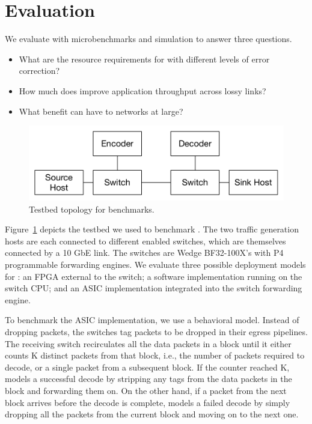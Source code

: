 \section{Evaluation}
\label{sec:evaluation}

We evaluate \OurSys with microbenchmarks and simulation to answer three questions.
\begin{itemize}

\item What are the resource requirements for \OurSys with different levels of 
error correction?

\item How much does \OurSys improve application throughput across lossy links?

\item What benefit can \OurSys have to networks at large?
\end{itemize}

\begin{figure}
  \centering
  \includegraphics[width=0.3\paperwidth]{exp_topo.pdf}
  \caption{\label{fig:exp_topo} Testbed topology for benchmarks.}
\end{figure}

Figure~\ref{fig:exp_topo} depicts the testbed we used to benchmark \OurSys.
The two traffic generation hosts are each connected to different \OurSys
enabled switches, which are themselves connected by a 10 GbE link. The
switches are Wedge BF32-100X's with P4 programmable forwarding engines. We
evaluate three possible deployment models for \OurSys: an FPGA external to
the switch; a software implementation running on the switch CPU; and an ASIC  
implementation integrated into the switch forwarding engine. 

To benchmark the ASIC implementation, we use a behavioral model. Instead  of
dropping packets, the switches tag packets to be dropped in their  egress
pipelines. The receiving switch recirculates all the data packets in a block 
until it either counts K distinct packets from that block, i.e., the number of packets 
required to decode, or a single packet from a subsequent block. If the counter 
reached K, \OurSys models a successful decode by stripping any tags from the 
data packets in the block and forwarding them on. On the other hand, if 
a packet from the next block arrives before the decode is complete, \OurSys 
models a failed decode by simply dropping all the packets from the current 
block and moving on to the next one. 

